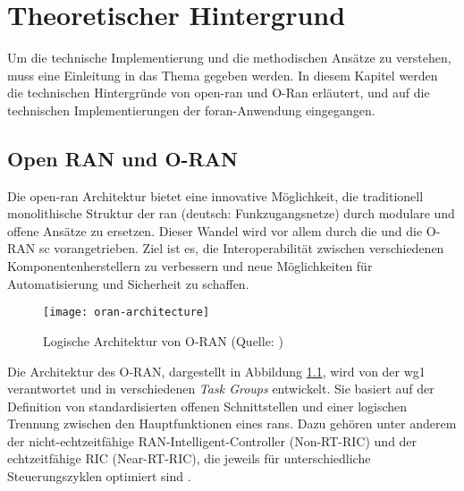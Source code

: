 \chapter{Theoretischer Hintergrund}
\label{chap:technischerHintergrund}
Um die technische Implementierung und die methodischen Ansätze zu verstehen, muss eine Einleitung in das Thema gegeben werden. In diesem Kapitel werden die technischen Hintergründe von \gls{open-ran} und O-Ran erläutert, und auf die technischen Implementierungen der \gls{foran}-Anwendung eingegangen.

\section{Open RAN und O-RAN}
\label{sec:tech-openran}
Die \gls{open-ran} Architektur bietet eine innovative Möglichkeit, die traditionell monolithische Struktur der \gls{ran} (deutsch: Funkzugangsnetze) durch modulare und offene Ansätze zu ersetzen. Dieser Wandel wird vor allem durch die \orana{} und die O-RAN \gls{sc} vorangetrieben. Ziel ist es, die Interoperabilität zwischen verschiedenen Komponentenherstellern zu verbessern und neue Möglichkeiten für Automatisierung und Sicherheit zu schaffen.

\begin{figure}[H]
    \centering
    \texttt{[image: oran-architecture]}
    \caption{Logische Architektur von O-RAN (Quelle: \autocite{ORANAlliance})}
    \label{fig:oran-architecture}
\end{figure}

Die Architektur des O-RAN, dargestellt in Abbildung \ref{fig:oran-architecture}, wird von der \gls{wg1} verantwortet und in verschiedenen \textit{Task Groups} entwickelt. Sie basiert auf der Definition von standardisierten offenen Schnittstellen und einer logischen Trennung zwischen den Hauptfunktionen eines \glspl{ran}. Dazu gehören unter anderem der nicht-echtzeitfähige RAN-Intelligent-Controller (Non-RT-RIC) und der echtzeitfähige RIC (Near-RT-RIC), die jeweils für unterschiedliche Steuerungszyklen optimiert sind \autocite{o-ranworkgroup1usecasesandoverallarchitectureORANArchitectureDescription2024}. 

